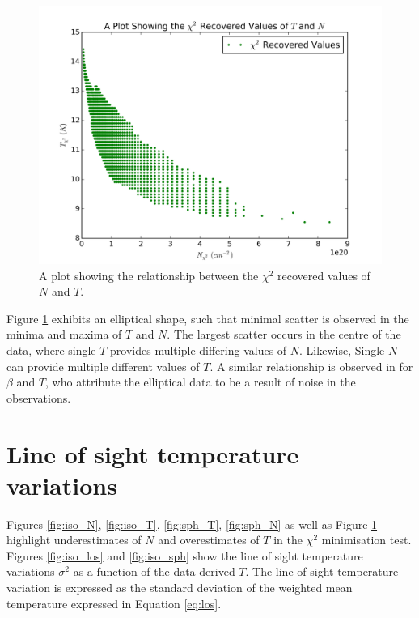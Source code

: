 \documentclass{report}
\begin{document}
\begin{figure}[H]
  \centering
  \includegraphics[width=0.5\linewidth]{../img/sph/contours.png}
  \caption{A plot showing the relationship between the $\chi^{2}$ recovered values of $N$ and $T$.}\label{fig:contours}
\end{figure}

Figure \ref{fig:contours} exhibits an elliptical shape, such that minimal scatter is observed in the minima and maxima of $T$ and $N$. The largest scatter occurs in the centre of the data, where single $T$ provides multiple differing values of $N$. Likewise, Single $N$ can provide multiple different values of $T$. A similar relationship is observed in \textcite{noise,noiseb} for $\beta$ and $T$, who attribute the elliptical data to be a result of noise in the observations.

\section{Line of sight temperature variations}
Figures \ref{fig:iso_N}, \ref{fig:iso_T},  \ref{fig:sph_T}, \ref{fig:sph_N} as well as Figure \ref{fig:contours} highlight underestimates of $N$ and overestimates of $T$ in the $\chi^{2}$ minimisation test. Figures \ref{fig:iso_los} and
\ref{fig:iso_sph} show the line of sight temperature variations $\sigma^{2}$ as a function of the data derived $T$. The line of sight temperature variation is expressed as the standard deviation of the weighted mean temperature expressed in Equation \ref{eq:los}.
\end{document}
